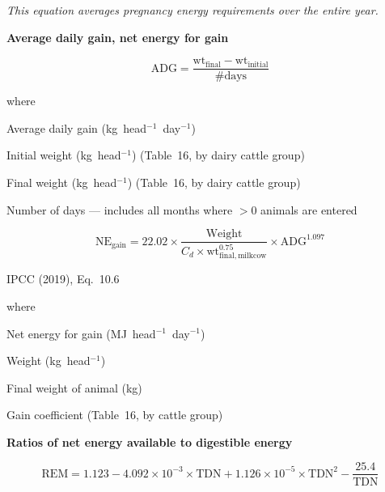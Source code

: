 \noindent\textit{This equation averages pregnancy energy requirements over the
entire year.}

\bigskip
\noindent\textbf{Average daily gain, net energy for gain}

\begin{equation}
    \mathrm{ADG} = \frac{\mathrm{wt}_{\mathrm{final}} - \mathrm{wt}_{\mathrm{initial}}}
                        {\#\mathrm{days}}
    \tag{Eq.\ 3.2.1.6}
\end{equation}

\noindent where
\begin{description}[font=\normalfont, leftmargin=9em, style=sameline, nosep]
    \item[$\mathrm{ADG}$] Average daily gain (kg~head$^{-1}$~day$^{-1}$)
    \item[$\mathrm{wt}_{\mathrm{initial}}$] Initial weight (kg~head$^{-1}$) (Table~16,
          by dairy cattle group)
    \item[$\mathrm{wt}_{\mathrm{final}}$] Final weight (kg~head$^{-1}$) (Table~16,
          by dairy cattle group)
    \item[$\#\mathrm{days}$] Number of days --- includes all months where $>0$ animals
          are entered
\end{description}

\begin{equation}
    \mathrm{NE}_{\mathrm{gain}} = 22.02 \times
        \frac{\mathrm{Weight}}{C_d \times \mathrm{wt}_{\mathrm{final,milkcow}}^{0.75}}
        \times \mathrm{ADG}^{1.097}
    \tag{Eq.\ 3.2.1.7}
\end{equation}

\noindent IPCC (2019), Eq.~10.6

\noindent where
\begin{description}[font=\normalfont, leftmargin=9em, style=sameline, nosep]
    \item[$\mathrm{NE}_{\mathrm{gain}}$] Net energy for gain (MJ~head$^{-1}$~day$^{-1}$)
    \item[$\mathrm{Weight}$] Weight (kg~head$^{-1}$)
    \item[$\mathrm{wt}_{\mathrm{final,milkcow}}$] Final weight of animal (kg)
    \item[$C_d$] Gain coefficient (Table~16, by cattle group)
\end{description}

\bigskip
\noindent\textbf{Ratios of net energy available to digestible energy}

\begin{equation}
    \mathrm{REM} = 1.123 - 4.092 \times 10^{-3} \times \mathrm{TDN}
        + 1.126 \times 10^{-5} \times \mathrm{TDN}^{2}
        - \frac{25.4}{\mathrm{TDN}}
    \tag{Eq.\ 3.2.1.8}
\end{equation}

